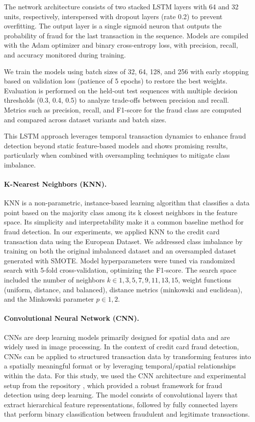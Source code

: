 \documentclass{article}
\begin{document}
The network architecture consists of two stacked LSTM layers with 64 and 32 units, respectively, interspersed with dropout layers (rate 0.2) to prevent overfitting. The output layer is a single sigmoid neuron that outputs the probability of fraud for the last transaction in the sequence. Models are compiled with the Adam optimizer and binary cross-entropy loss, with precision, recall, and accuracy monitored during training.

We train the models using batch sizes of 32, 64, 128, and 256 with early stopping based on validation loss (patience of 5 epochs) to restore the best weights. Evaluation is performed on the held-out test sequences with multiple decision thresholds (0.3, 0.4, 0.5) to analyze trade-offs between precision and recall. Metrics such as precision, recall, and F1-score for the fraud class are computed and compared across dataset variants and batch sizes.

This LSTM approach leverages temporal transaction dynamics to enhance fraud detection beyond static feature-based models and shows promising results, particularly when combined with oversampling techniques to mitigate class imbalance.

\paragraph{K-Nearest Neighbors (KNN).}
KNN is a non-parametric, instance-based learning algorithm that classifies a data point based on the majority class among its k closest neighbors in the feature space. Its simplicity and interpretability make it a common baseline method for fraud detection.
In our experiments, we applied KNN to the credit card transaction data using the European Dataset. We addressed class imbalance by training on both the original imbalanced dataset and an oversampled dataset generated with SMOTE. Model hyperparameters were tuned via randomized search with 5-fold cross-validation, optimizing the F1-score. The search space included the number of neighbors $k \in {1, 3, 5, 7, 9, 11, 13, 15}$, weight functions (uniform, distance, and balanced), distance metrics (minkowski and euclidean), and the Minkowski parameter $p \in {1, 2}$.

\paragraph{Convolutional Neural Network (CNN).}
CNNs are deep learning models primarily designed for spatial data and are widely used in image processing. In the context of credit card fraud detection, CNNs can be applied to structured transaction data by transforming features into a spatially meaningful format or by leveraging temporal/spatial relationships within the data.
For this study, we used the CNN architecture and experimental setup from the repository \cite{AI4Risk_antifraud}, which provided a robust framework for fraud detection using deep learning. The model consists of convolutional layers that extract hierarchical feature representations, followed by fully connected layers that perform binary classification between fraudulent and legitimate transactions.
\end{document}
